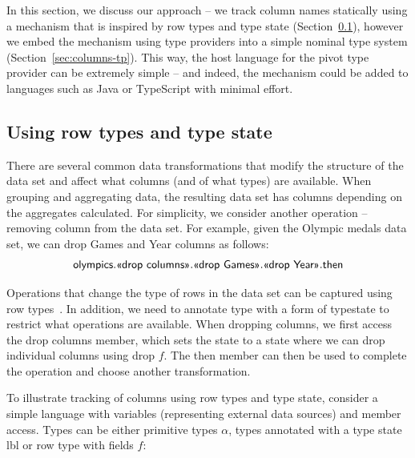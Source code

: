 \documentclass[a4paper,UKenglish]{lipics-v2016}
\theoremstyle{plain}
\theoremstyle{definition}
\newcommand{\ident}[1]{\textnormal{\sffamily #1}}
\newcommand{\qident}[1]{\textnormal{\sffamily \guillemotleft #1\guillemotright}}
\begin{document}
In this section, we discuss our approach -- we track column names statically using a mechanism
that is inspired by row types and type state (Section~\ref{sec:columns-row}), however we 
embed the mechanism using type providers into a simple nominal type system (Section~\ref{sec:columns-tp}).
This way, the host language for the pivot type provider can be extremely simple -- and indeed, the
mechanism could be added to languages such as Java or TypeScript with minimal effort. 


\subsection{Using row types and type state}
\label{sec:columns-row}

There are several common data transformations that modify the structure of the data set and affect
what columns (and of what types) are available. When grouping and aggregating data, the resulting
data set has columns depending on the aggregates calculated. For simplicity, we consider another 
operation -- removing column from the data set. For example, given the Olympic medals data set, we 
can drop \ident{Games} and \ident{Year} columns as follows:
%
\begin{equation*}
  \begin{array}{l}
    \ident{olympics}.\qident{drop columns}.\qident{drop Games}.\qident{drop Year}.\ident{then}
  \end{array}
\end{equation*}

\noindent
Operations that change the type of rows in the data set can be captured using row types~\cite{rowtypes}. 
In addition, we need to annotate type with a form of typestate \cite{typestate} to restrict what operations are available. 
When dropping columns, we first access the \qident{drop columns} member, which sets the state to
a state where we can drop individual columns using \qident{drop $f$}. The \ident{then} member can 
then be used to complete the operation and choose another transformation.

To illustrate tracking of columns using row types and type state, consider a simple language with
variables (representing external data sources) and member access. Types can be either primitive 
types $\alpha$, types annotated with a type state \ident{lbl} or row type with fields $f$:
\end{document}
